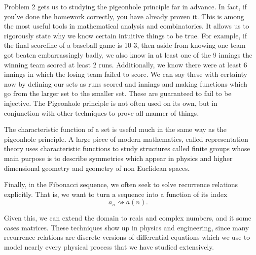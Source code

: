 \documentclass[16 pt]{amsart}
\theoremstyle{definition}
\theoremstyle{remark}
\numberwithin{equation}{subsection}
\begin{document}
Problem 2 gets us to studying the pigeonhole principle far in advance.  In fact, if you've done the homework correctly, you have already proven it.  This is among the most useful tools in mathematical analysis and combinatorics.  It allows us to rigorously state why we know certain intuitive things to be true.  For example, if the final scoreline of a baseball game is 10-3, then aside from knowing one team got beaten embarrassingly badly, we also know in at least one of the 9 innings the winning team scored at least 2 runs.  Additionally, we know there were at least 6 innings in which the losing team failed to score.  We can say these with certainty now by defining our sets as runs scored and innings and making functions which go from the larger set to the smaller set. These are guaranteed to fail to be injective.  The Pigeonhole principle is not often used on its own, but in conjunction with other techniques to prove all manner of things. \\

\par The characteristic function of a set is useful much in the same way as the pigeonhole principle.  A large piece of modern mathematics, called representation theory uses characteristic functions to study structures called finite groups whose main purpose is to describe symmetries which appear in physics and higher dimensional geometry and geometry of non Euclidean spaces.\\

\par Finally, in the Fibonacci sequence, we often seek to solve recurrence relations explicitly.  That is, we want to turn a sequence into a function of its index 
\[
a_n \rightsquigarrow a(n).
\]

Given this, we can extend the domain to reals and complex numbers, and it some cases matrices.  These techniques show up in physics and engineering, since many recurrence relations are discrete versions of differential equations which we use to model nearly every physical process that we have studied extensively.  
\end{document}

